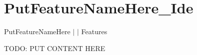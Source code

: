 \chapter{Put\+Feature\+Name\+Here\+\_\+\+Ide }
\hypertarget{md__docs_2_ide_2_features_2_put_feature_name_here___ide}{}\label{md__docs_2_ide_2_features_2_put_feature_name_here___ide}
Put\+Feature\+Name\+Here \texorpdfstring{$\vert$}{|}  \texorpdfstring{$\vert$}{|} Features



TODO\+: PUT CONTENT HERE 